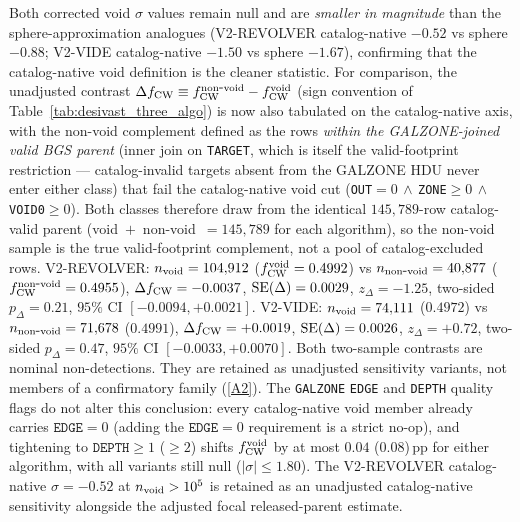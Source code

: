 \documentclass[twocolumn,linenumbers]{aastex702}
\newcommand{\repoBase}{https://github.com/Hubify-Projects/bigbounce/blob/main}
\begin{document}
Both corrected void $\sigma$ values remain null and are
\emph{smaller in magnitude} than the sphere-approximation analogues
(V2-REVOLVER catalog-native $-0.52$ vs sphere $-0.88$; V2-VIDE
catalog-native $-1.50$ vs sphere $-1.67$), confirming that the
catalog-native void definition is the cleaner statistic.
For comparison, the unadjusted contrast $\Delta f_{\rm CW} \equiv
f_{\rm CW}^{\rm non\mbox{-}void} - f_{\rm CW}^{\rm void}$
(sign convention of Table~\ref{tab:desivast_three_algo}) is now also
tabulated on the catalog-native axis, with the non-void complement
defined as the rows \emph{within the GALZONE-joined valid BGS parent}
(inner join on \texttt{TARGET}, which is itself the valid-footprint
restriction --- catalog-invalid targets absent from the GALZONE HDU
never enter either class) that fail the catalog-native void cut
(\texttt{OUT}$=0\,\wedge\,$\texttt{ZONE}$\geq 0\,\wedge\,$%
\texttt{VOID0}$\geq 0$). Both classes therefore draw from the identical
$145{,}789$-row catalog-valid parent (void~$+$~non-void~$=145{,}789$ for
each algorithm), so the non-void sample is the true valid-footprint
complement, not a pool of catalog-excluded rows. V2-REVOLVER: $n_{\rm void} = 104{,}912$
($f_{\rm CW}^{\rm void} = 0.4992$) vs $n_{\rm non\mbox{-}void} =
40{,}877$ ($f_{\rm CW}^{\rm non\mbox{-}void} = 0.4955$),
$\Delta f_{\rm CW} = -0.0037$, ${\rm SE}(\Delta) = 0.0029$,
$z_\Delta = -1.25$, two-sided $p_\Delta = 0.21$, $95\%$ CI
$[-0.0094, +0.0021]$. V2-VIDE: $n_{\rm void} = 74{,}111$
($0.4972$) vs $n_{\rm non\mbox{-}void} = 71{,}678$ ($0.4991$),
$\Delta f_{\rm CW} = +0.0019$, ${\rm SE}(\Delta) = 0.0026$,
$z_\Delta = +0.72$, two-sided $p_\Delta = 0.47$, $95\%$ CI
$[-0.0033, +0.0070]$. Both two-sample contrasts are nominal
non-detections. They are retained as unadjusted sensitivity variants,
not members of a confirmatory family
(\href{\repoBase/pipelines/p5\_desi\_chirality/outputs/30\_ext4\_galzone\_complement\_contrasts.json}{[A2]}). The
\texttt{GALZONE} \texttt{EDGE} and \texttt{DEPTH} quality flags do not
alter this conclusion: every catalog-native void member already
carries $\texttt{EDGE} = 0$ (adding the $\texttt{EDGE} = 0$
requirement is a strict no-op), and tightening to
$\texttt{DEPTH} \geq 1$ ($\geq 2$) shifts $f_{\rm CW}^{\rm void}$ by
at most $0.04$ ($0.08$)\,pp for either algorithm, with all variants
still null ($|\sigma| \leq 1.80$). The V2-REVOLVER
catalog-native $\sigma = -0.52$ at $n_{\rm void} > 10^{5}$ is retained
as an unadjusted catalog-native sensitivity alongside the adjusted
focal released-parent estimate.
\end{document}
